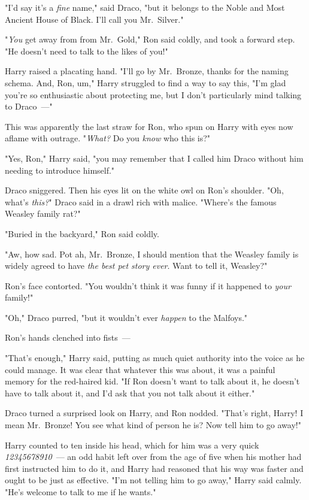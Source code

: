 "I'd say it's a \emph{fine} name," said Draco, "but it belongs to the Noble and
Most Ancient House of Black. I'll call you Mr.~Silver."

"\emph{You} get away from{\el} from Mr.~Gold," Ron said coldly, and took a
forward step. "He doesn't need to talk to the likes of you!"

Harry raised a placating hand. "I'll go by Mr.~Bronze, thanks for the naming
schema. And, Ron, um," Harry struggled to find a way to say this, "I'm glad
you're so{\el} enthusiastic about protecting me, but I don't particularly
mind talking to Draco~---"

This was apparently the last straw for Ron, who spun on Harry with eyes now
aflame with outrage. "\emph{What?} Do you \emph{know} who this is?"

"Yes, Ron," Harry said, "you may remember that I called him Draco without him
needing to introduce himself."

Draco sniggered. Then his eyes lit on the white owl on Ron's shoulder. "Oh,
what's \emph{this?}" Draco said in a drawl rich with malice. "Where's the
famous Weasley family rat?"

"Buried in the backyard," Ron said coldly.

"Aw, how sad. Pot{\el} ah, Mr.~Bronze, I should mention that the Weasley
family is widely agreed to have \emph{the best pet story ever}. Want to tell
it, Weasley?"

Ron's face contorted. "You wouldn't think it was funny if it happened to
\emph{your} family!"

"Oh," Draco purred, "but it wouldn't ever \emph{happen} to the Malfoys."

Ron's hands clenched into fists~---

"That's enough," Harry said, putting as much quiet authority into the voice as
he could manage. It was clear that whatever this was about, it was a painful
memory for the red-haired kid. "If Ron doesn't want to talk about it, he
doesn't have to talk about it, and I'd ask that you not talk about it either."

Draco turned a surprised look on Harry, and Ron nodded. "That's right, Harry! I
mean Mr.~Bronze! You see what kind of person he is? Now tell him to go away!"

Harry counted to ten inside his head, which for him was a very quick
\emph{12345678910}~--- an odd habit left over from the age of five when his
mother had first instructed him to do it, and Harry had reasoned that his way
was faster and ought to be just as effective. "I'm not telling him to go away,"
Harry said calmly. "He's welcome to talk to me if he wants."

